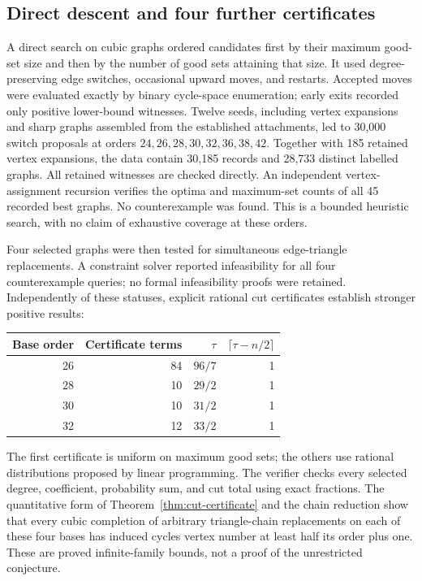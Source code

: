\documentclass[11pt]{article}
\begin{document}
\subsection{Direct descent and four further certificates}\label{sec:round18}
A direct search on cubic graphs ordered candidates first by their
maximum good-set size and then by the number of good sets attaining
that size. It used degree-preserving edge switches, occasional
upward moves, and restarts. Accepted moves were evaluated exactly
by binary cycle-space enumeration; early exits recorded only
positive lower-bound witnesses. Twelve seeds, including vertex
expansions and sharp graphs assembled from the established
attachments, led to 30,000 switch proposals at orders
$24,26,28,30,32,36,38,42$. Together with 185 retained vertex
expansions, the data contain 30,185 records and 28,733 distinct
labelled graphs. All retained witnesses are checked directly.
An independent vertex-assignment recursion verifies the optima
and maximum-set counts of all 45 recorded best graphs.
No counterexample was found. This is a bounded heuristic search,
with no claim of exhaustive coverage at these orders.

Four selected graphs were then tested for simultaneous edge-triangle
replacements. A constraint solver reported infeasibility for all
four counterexample queries; no formal infeasibility proofs were
retained. Independently of these statuses, explicit rational cut
certificates establish stronger positive results:
\begin{center}
\begin{tabular}{rrrr}
\toprule
Base order & Certificate terms & $\tau$ & $\lceil\tau-n/2\rceil$\\
\midrule
26 & 84 & $96/7$ & 1\\
28 & 10 & $29/2$ & 1\\
30 & 10 & $31/2$ & 1\\
32 & 12 & $33/2$ & 1\\
\bottomrule
\end{tabular}
\end{center}
The first certificate is uniform on maximum good sets; the others
use rational distributions proposed by linear programming.
The verifier checks every selected degree, coefficient, probability
sum, and cut total using exact fractions. The quantitative form of
Theorem~\ref{thm:cut-certificate} and the chain reduction show that
every cubic completion of arbitrary triangle-chain replacements on
each of these four bases has induced cycles vertex number at least
half its order plus one. These are proved infinite-family bounds,
not a proof of the unrestricted conjecture.
\end{document}
